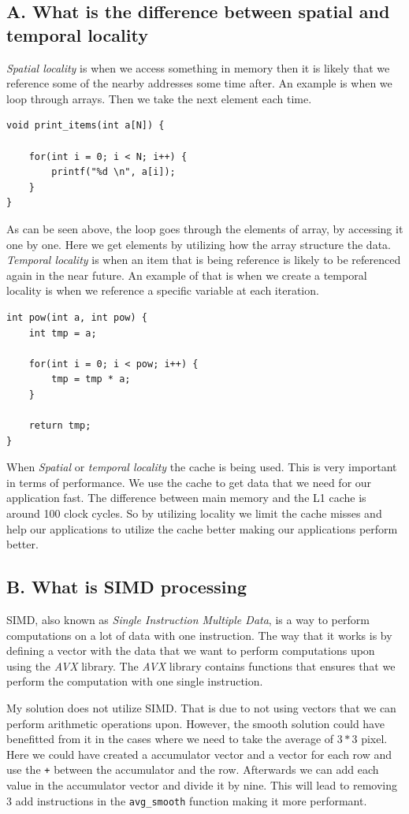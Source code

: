 \documentclass[11pt]{article}
\newcommand{\code}[1]{{\colorbox{lightgray!15}{\color{black}\texttt{#1}}}}
\begin{document}
\subsection{A. What is the difference between spatial and temporal locality}
\textit{Spatial locality} is when we access something in memory then it is likely that we reference some of the nearby addresses some time after. An example is
when we loop through arrays. Then we take the next element each time.
\begin{lstlisting}
void print_items(int a[N]) {

    for(int i = 0; i < N; i++) {
        printf("%d \n", a[i]);
    }
}
\end{lstlisting}
As can be seen above, the loop goes through the elements of array, by accessing it one by one. Here we get elements 
by utilizing how the array structure the data. \textit{Temporal locality} is when an item that is being reference is likely to be 
referenced again in the near future. An example of that is when we create a temporal locality is when we reference a specific variable
at each iteration.
\begin{lstlisting}
int pow(int a, int pow) {
    int tmp = a;

    for(int i = 0; i < pow; i++) {
        tmp = tmp * a;
    }

    return tmp;
}
\end{lstlisting}
When \textit{Spatial} or \textit{temporal locality} the cache is being used. This is very important in terms of performance.
We use the cache to get data that we need for our application fast. The difference between main memory and the L1 cache is around 100 clock cycles.
So by utilizing locality we limit the cache misses and help our applications to utilize the cache better making our applications perform better.

\subsection{B. What is SIMD processing}
SIMD, also known as \textit{Single Instruction Multiple Data}, is a way to perform computations on a lot of data
with one instruction. The way that it works is by defining a vector with the data that we want to perform computations
upon using the \textit{AVX} library. The \textit{AVX} library contains functions that ensures that we perform the computation 
with one single instruction. 

My solution does not utilize SIMD. That is due to not using vectors that we can perform arithmetic operations upon. However, the smooth
solution could have benefitted from it in the cases where we need to take the average of $3 * 3$ pixel. Here we could have created a accumulator vector
and a vector for each row and use the \code{+} between the accumulator and the row. Afterwards we can add each value in the accumulator vector and divide it by nine.
This will lead to removing 3 add instructions in the \code{avg\_smooth} function making it more performant.
\end{document}
